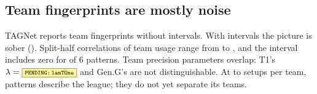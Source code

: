 \subsection{Team fingerprints are mostly noise}
\label{sec:fingerprints}


TAGNet reports team fingerprints without intervals.
With intervals the picture is sober ().
Split-half correlations of team usage range from  to , and the interval includes zero for  of 6 patterns.
Team precision parameters overlap: T1's $\lambda=\V{lamTOne}$  and Gen.G's   are not distinguishable.
At  to  setups per team, patterns describe the league; they do not yet separate its teams.
